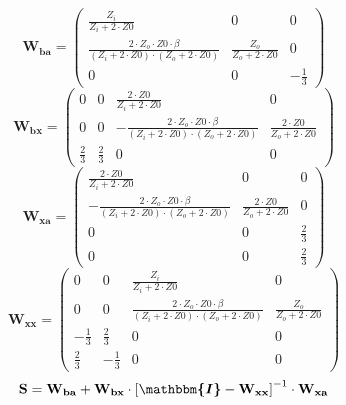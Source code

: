 \[ \mathbf{W_{ba}} = \left(\begin{smallmatrix} \frac{Z_i}{Z_i+2\cdot
Z0} & 0 & 0 \\ \frac{2\cdot Z_o\cdot Z0\cdot \beta}{ (Z_i+2\cdot Z0
)\cdot (Z_o+2\cdot Z0 )} & \frac{Z_o}{Z_o+2\cdot Z0} & 0 \\ 0 & 0 &
-\frac{1}{3} \end{smallmatrix}\right) \]
\[ \mathbf{W_{bx}} = \left(\begin{smallmatrix} 0 & 0 & \frac{2\cdot
Z0}{Z_i+2\cdot Z0} & 0 \\ 0 & 0 & -\frac{2\cdot Z_o\cdot Z0\cdot
\beta}{ (Z_i+2\cdot Z0 )\cdot (Z_o+2\cdot Z0 )} & \frac{2\cdot
Z0}{Z_o+2\cdot Z0} \\ \frac{2}{3} & \frac{2}{3} & 0 & 0
\end{smallmatrix}\right) \]
\[ \mathbf{W_{xa}} = \left(\begin{smallmatrix} \frac{2\cdot
Z0}{Z_i+2\cdot Z0} & 0 & 0 \\ -\frac{2\cdot Z_o\cdot Z0\cdot \beta}{
(Z_i+2\cdot Z0 )\cdot (Z_o+2\cdot Z0 )} & \frac{2\cdot Z0}{Z_o+2\cdot
Z0} & 0 \\ 0 & 0 & \frac{2}{3} \\ 0 & 0 & \frac{2}{3}
\end{smallmatrix}\right) \]
\[ \mathbf{W_{xx}} = \left(\begin{smallmatrix} 0 & 0 &
\frac{Z_i}{Z_i+2\cdot Z0} & 0 \\ 0 & 0 & \frac{2\cdot Z_o\cdot Z0\cdot
\beta}{ (Z_i+2\cdot Z0 )\cdot (Z_o+2\cdot Z0 )} &
\frac{Z_o}{Z_o+2\cdot Z0} \\ -\frac{1}{3} & \frac{2}{3} & 0 & 0 \\
\frac{2}{3} & -\frac{1}{3} & 0 & 0 \end{smallmatrix}\right) \]
\[ \mathbf{S}=\mathbf{W_{ba}}+\mathbf{W_{bx}}\cdot\left[
\boldsymbol{\mathbbm{I}}
-\mathbf{W_{xx}}\right]^{-1}\cdot\mathbf{W_{xa}} \]
